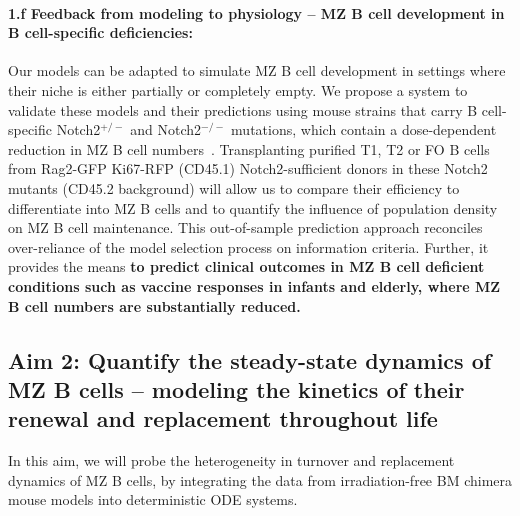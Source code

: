 \documentclass[11pt]{article}
\newcommand{\para}[1]{\vspace*{-4.5mm}\paragraph{#1}}
\begin{document}
\para{{1.f Feedback from modeling to physiology -- MZ B cell development in B cell-specific deficiencies:}}
Our models can be adapted to simulate MZ B cell development in settings where their niche is either partially or completely empty. %
We propose a system to validate these models and their predictions using mouse strains that carry B cell-specific Notch2$^{+/-}$ and Notch2$^{-/-}$ mutations, which contain a dose-dependent reduction in MZ B cell numbers~\cite{Witt_2003, Saito_2003}.
Transplanting purified T1, T2 or FO B cells from Rag2-GFP Ki67-RFP (CD45.1) Notch2-sufficient donors in these Notch2 mutants (CD45.2 background) will allow us to compare their efficiency to differentiate into MZ B cells and to quantify the influence of population density on MZ B cell maintenance. 
This out-of-sample prediction approach reconciles over-reliance of the model selection process on information criteria. %
Further, it provides the means \textbf{to predict clinical outcomes in MZ B cell deficient conditions such as vaccine responses in infants and elderly, where MZ B cell numbers are substantially reduced.
}

\vspace{-1mm}
\subsection*{Aim 2: Quantify the steady-state dynamics of MZ B cells -- modeling the kinetics of their\\ renewal and replacement throughout life}
\vspace{-1mm}

In this aim, we will probe the heterogeneity in  turnover and replacement dynamics of MZ B cells, by integrating the data from irradiation-free BM chimera mouse models into deterministic ODE systems.
\end{document}
